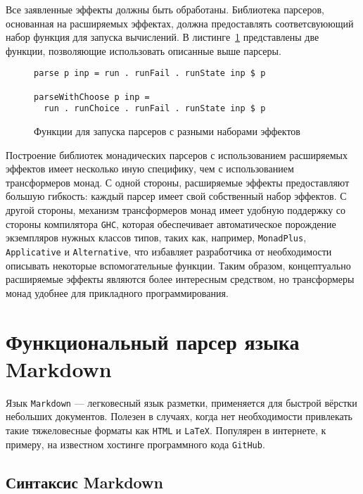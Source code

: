 Все заявленные эффекты должны быть обработаны. Библиотека парсеров, основанная
на расширяемых эффектах, должна предоставлять соответсвуюющий набор функция
для запуска вычислений. В листинге~\ref{listing:ExtEffectsRunners} представлены
две функции, позволяющие использовать описанные выше парсеры.

\begin{figure}[t]
\begin{lstlisting}
parse p inp = run . runFail . runState inp $ p

parseWithChoose p inp =
  run . runChoice . runFail . runState inp $ p
\end{lstlisting}
\caption{Функции для запуска парсеров с разными наборами эффектов}
\label{listing:ExtEffectsRunners}
\end{figure}

Построение библиотек монадических парсеров с использованием расширяемых эффектов
имеет несколько иную специфику, чем с использованием трансформеров монад. С
одной стороны, расширяемые эффекты предоставляют большую гибкость: каждый парсер
имеет свой собственный набор эффектов. С другой стороны, механизм трансформеров
монад имеет удобную поддержку со стороны компилятора \lstinline{GHC}, которая
обеспечивает автоматическое порождение экземпляров нужных классов типов, таких
как, например, \lstinline{MonadPlus}, \lstinline{Applicative} и
\lstinline{Alternative}, что избавляет разработчика от необходимости описывать
некоторые вспомогательные функции. Таким образом, концептуально расширяемые
эффекты являются более интересным средством, но трансформеры монад удобнее для
прикладного программирования.

\newpage

\chapter{Функциональный парсер языка Markdown}

Язык \lstinline{Markdown} --- легковесный язык разметки, применяется для быстрой
вёрстки небольших документов. Полезен в случаях, когда нет необходимости привлекать
такие тяжеловесные форматы как \lstinline{HTML} и \lstinline{LaTeX}. Популярен в
интернете, к примеру, на известном хостинге программного кода
\lstinline{GitHub}.

\section{Синтаксис Markdown}

